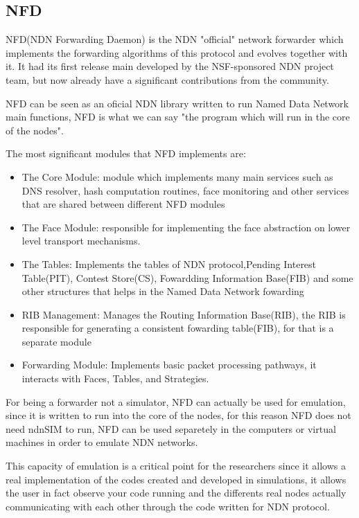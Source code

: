 \documentclass[preprint,12pt]{elsarticle}
\begin{document}
\subsection{NFD}
NFD(NDN Forwarding Daemon) is the NDN "official" network forwarder which implements the forwarding algorithms of this protocol and evolves together with it. It had its first release main developed by the NSF-sponsored NDN project team, but now already have a significant contributions from the community.\par
NFD can be seen as an oficial NDN library written to run Named Data Network main functions, NFD is what we can say "the program which will run in the core of the nodes".\par
The most significant modules that NFD implements are:

	\begin{itemize}

		\item The Core Module: module which implements many main services such as DNS resolver, hash computation routines, face monitoring and other services that are shared between different NFD modules
		
		\item The Face Module: responsible for implementing the face abstraction on lower level transport mechanisms. 
		
		\item The Tables: Implements the tables of NDN protocol,Pending Interest Table(PIT), Contest Store(CS), Fowardding Information Base(FIB) and some other structures that helps in the Named Data Network fowarding
		
		\item RIB Management: Manages the Routing Information Base(RIB), the RIB is responsible for generating a consistent fowarding table(FIB), for that is a separate module

		\item Forwarding Module: Implements basic packet processing pathways, it interacts with Faces, Tables, and Strategies.

	\end{itemize}
For being a forwarder not a simulator, NFD can actually be used for emulation, since it is written to run into the core of the nodes, for this reason NFD does not need ndnSIM to run, NFD can be used separetely in the computers or virtual machines in order to emulate NDN networks.\par
This capacity of emulation is a critical point for the researchers since it allows a real implementation of the codes created and developed in simulations, it allows the user in fact observe your code running and the differents real nodes actually communicating with each other through the code written for NDN protocol.\par
\end{document}
